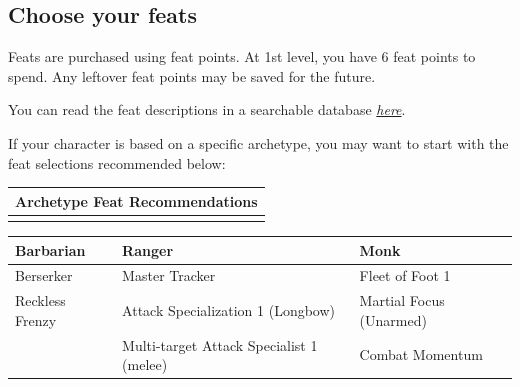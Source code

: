 \documentclass[12pt]{report}
\begin{document}
\subsection{Choose your feats}\label{choose-your-feats}

Feats are purchased using feat points. At 1st level, you have 6 feat
points to spend. Any leftover feat points may be saved for the future.

You can read the feat descriptions in a searchable database
\href{http://www.openlegendrpg.com/feats}{\emph{here}}.

If your character is based on a specific archetype, you may want to
start with the feat selections recommended below:

\begin{longtable}[c]{@{}l@{}}
\toprule
Archetype Feat Recommendations\tabularnewline
\midrule
\endhead
\tabularnewline
\bottomrule
\end{longtable}

\begin{longtable}[c]{@{}lll@{}}
\toprule
Barbarian & Ranger & Monk\tabularnewline
\midrule
\endhead
Berserker & Master Tracker & Fleet of Foot 1\tabularnewline
Reckless Frenzy & Attack Specialization 1 (Longbow) & Martial Focus
(Unarmed)\tabularnewline
& Multi-target Attack Specialist 1 (melee) & Combat
Momentum\tabularnewline
\bottomrule
\end{longtable}
\end{document}
